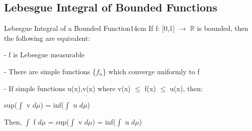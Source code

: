     \newpage





\subsection{ Lebesgue Integral of Bounded Functions }

    \begin{wtheorem}{Lebesgue Integral of a Bounded Function}{14cm}
        If f: [0,1] $\rightarrow$ $\mathbb{R}$ is bounded, then
        the following are equivalent:

        \hspace{0.5cm}
        - f is Lebesgue measurable

        \hspace{0.5cm}
        - There are simple functions \{$f_n$\} which converge uniformly to f

        \hspace{0.5cm}
        - If simple functions u(x),v(x) where v(x) $\leq$ f(x) $\leq$ u(x), then:

        \hspace{1cm}
        sup($\int$ v $d\mu$) = inf($\int$ u $d\mu$)

        Then, $\int$ f $d\mu$ = sup($\int$ v $d\mu$) = inf($\int$ u $d\mu$)
    \end{wtheorem}

